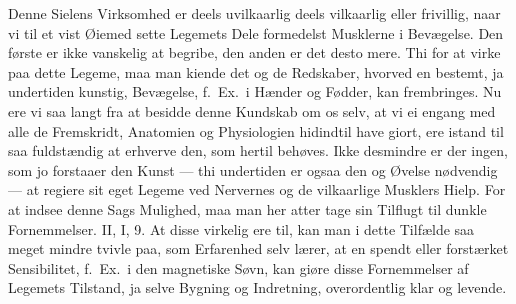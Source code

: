 \documentclass[12pt,a4paper]{article}
\newcommand{\opage}[1]{\marginnote{\footnotesize\textit{[#1]}}}
\begin{document}
Denne Sielens Virksomhed er deels uvilkaarlig deels vilkaarlig eller frivillig, naar vi
til et vist Øiemed sette Legemets Dele formedelst Musklerne i Bevægelse. Den første er
ikke vanskelig at begribe, den anden er det desto mere. Thi for at virke paa dette
Legeme, maa man kiende det og de Redskaber, hvorved en bestemt, ja undertiden kunstig,
Bevægelse, f.~Ex.\ i Hænder og Fødder, kan frembringes. Nu ere vi saa langt fra at
besidde denne Kundskab om os selv, at vi ei engang med alle de Fremskridt, Anatomien og
Physiologien hidindtil have giort, ere istand til saa fuldstændig at erhverve den, som
hertil behøves. Ikke desmindre er der ingen, som jo forstaaer den Kunst --- thi
undertiden er ogsaa den og Øvelse nødvendig --- at regiere sit eget Legeme ved Nervernes
og de vilkaarlige Musklers Hielp. For at indsee denne Sags Mulighed, maa man her atter
tage sin Tilflugt til dunkle Fornemmelser. II, I, 9. At disse virkelig ere til, kan man
i dette Tilfælde saa meget mindre tvivle paa, som Erfarenhed selv lærer, at en spendt
eller forstærket Sensibilitet, f.~Ex.\ i den magnetiske Søvn, kan giøre disse
Fornemmelser af Legemets
\opage{83} Tilstand, ja selve Bygning og Indretning, overordentlig klar og levende.
\end{document}
